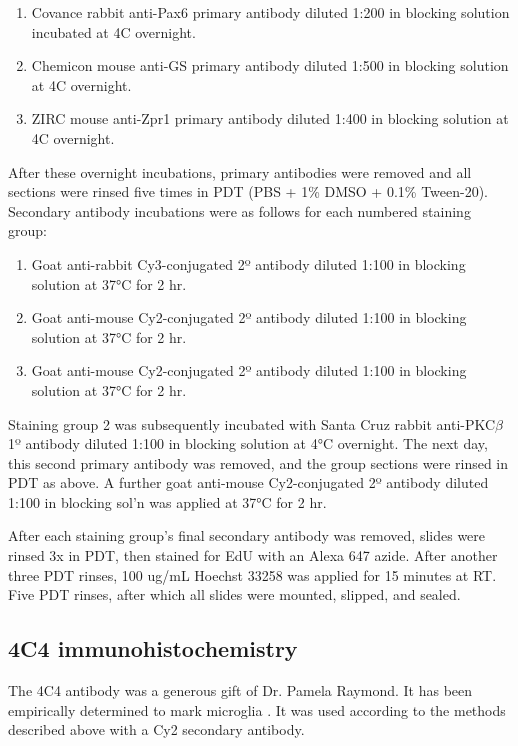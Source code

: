\begin{enumerate}
    \item Covance rabbit anti-Pax6 primary antibody diluted 1:200 in blocking solution incubated at 4\degree C overnight.
    \item Chemicon mouse anti-GS primary antibody diluted 1:500 in blocking solution at 4\degree C overnight.
    \item ZIRC mouse anti-Zpr1 primary antibody diluted 1:400 in blocking solution at 4\degree C overnight.
\end{enumerate}

After these overnight incubations, primary antibodies were removed and all sections were rinsed five times in PDT (PBS + 1\% DMSO + 0.1\% Tween-20). Secondary antibody incubations were as follows for each numbered staining group:

\begin{enumerate}
    \item Goat anti-rabbit Cy3-conjugated 2º antibody diluted 1:100 in blocking solution at 37°C for 2 hr.
    \item Goat anti-mouse Cy2-conjugated 2º antibody diluted 1:100 in blocking solution at 37°C for 2 hr.
    \item Goat anti-mouse Cy2-conjugated 2º antibody diluted 1:100 in blocking solution at 37°C for 2 hr.
\end{enumerate}

Staining group 2 was subsequently incubated with Santa Cruz rabbit anti-PKC$\beta$ 1º antibody diluted 1:100 in blocking solution at 4°C overnight. The next day, this second primary antibody was removed, and the group sections were rinsed in PDT as above. A further goat anti-mouse Cy2-conjugated 2º antibody diluted 1:100 in blocking sol’n was applied at 37°C for 2 hr.

After each staining group's final secondary antibody was removed, slides were rinsed 3x in PDT, then stained for EdU with an Alexa 647 azide. After another three PDT rinses, 100 ug/mL Hoechst 33258 was applied for 15 minutes at RT. Five PDT rinses, after which all slides were mounted, slipped, and sealed.

\subsection{4C4 immunohistochemistry}
\label{ssec:CMZ4C4histo}
The 4C4 antibody was a generous gift of Dr. Pamela Raymond. It has been empirically determined to mark microglia \cite{Becker2001}. It was used according to the methods described above with a Cy2 secondary antibody.

